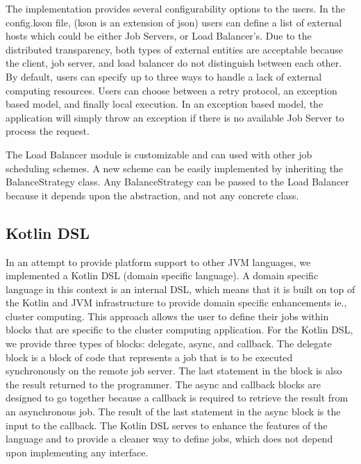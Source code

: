 The implementation provides several configurability options to the users.
In the config.kson file, (kson is an extension of json) users can
define a list of external hosts which could be either Job Servers,
or Load Balancer's.
Due to the distributed transparency, both types of external entities
are acceptable because the client, job server, and load balancer do
not distinguish between each other.
By default, users can specify up to three ways to handle
a lack of external computing resources.
Users can choose between a retry protocol, an exception based model,
and finally local execution.
In an exception based model, the application will simply throw
an exception if there is no available Job Server
to process the request.

The Load Balancer module is customizable and can used with other
job scheduling schemes.
A new scheme can be easily implemented by inheriting the BalanceStrategy
class.
Any BalanceStrategy can be passed to the Load Balancer because it depends upon
the abstraction, and not any concrete class.

\subsection{Kotlin DSL}\label{subsec:kotlinDsl}

In an attempt to provide platform support to other JVM languages, we
implemented a Kotlin DSL (domain specific language).
A domain specific language in this context is an internal DSL, which
means that it is built on top of the Kotlin and JVM infrastructure
to provide domain specific enhancements ie., cluster computing.
This approach allows the user to define their jobs within blocks
that are specific to the cluster computing application.
For the Kotlin DSL, we provide three types of blocks:
delegate, async, and callback.
The delegate block is a block of code that represents a job
that is to be executed synchronously on the remote job server.
The last statement in the block is also the result returned to the
programmer.
The async and callback blocks are designed to go together because
a callback is required to retrieve the result from an asynchronous
job.
The result of the last statement in the async block is the input
to the callback.
The Kotlin DSL serves to enhance the features of the language and to
provide a cleaner way to define jobs, which does not depend upon
implementing any interface.

